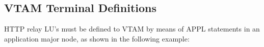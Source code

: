 \documentclass[letterpaper,10pt,english]{sphinxmanual}
\begin{document}
\subsection{VTAM Terminal Definitions}
\label{\detokenize{connectivity_guide:vtam-terminal-definitions}}\label{\detokenize{connectivity_guide:index-13}}
\sphinxAtStartPar
HTTP relay LU’s must be defined to VTAM by means of APPL statements in an application major node, as shown in the following example:

\begin{sphinxVerbatim}[commandchars=\\\{\}]
      
  
            
  

\end{sphinxVerbatim}
\end{document}
